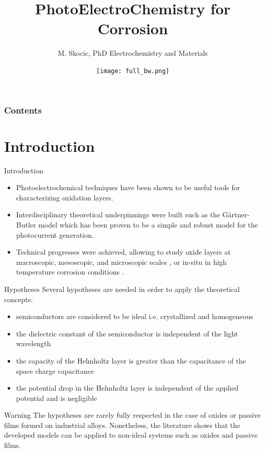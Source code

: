 \documentclass[10pt,compress]{beamer}
\title{PhotoElectroChemistry for Corrosion}
\author{M. Skocic, PhD Electrochemistry and Materials}
\date{\vfill \texttt{[image: full\_bw.png]}}
\begin{document}
    \begin{frame}
        \titlepage
    \end{frame}

    \begin{frame}
        \frametitle{Contents}
        \tableofcontents
    \end{frame}


\section{Introduction}
    \begin{frame}{Introduction}
        \begin{itemize}
            \item Photoelectrochemical techniques have been shown to be useful tools for characterizing oxidation layers. 
            \item Interdisciplinary theoretical underpinnings were built \citep{morrison1980, vijh1969, stimming1986, diquarto1997, wouters2007} 
                  such as the Gärtner-Butler model \citep{gartner1959,butler1977}
                  which has been proven to be a simple and robust model for the photocurrent generation. 
            \item Technical progresses were achieved, allowing to study oxide layers at 
                  macroscopic, mesoscopic, and microscopic scales 
                  \citep{benaboud2007, srisrual2011}, or in-situ in high temperature corrosion 
                  conditions \citep{bojinov2002,skocic2016}.
        \end{itemize}
    \end{frame}

    \begin{frame}{Hypotheses}
        Several hypotheses are needed in order to apply the theoretical concepts:  
        \begin{itemize}
            \item semiconductors are considered to be ideal i.e. crystallized and homogeneous  
            \item the dielectric constant of the semiconductor is independent of the light wavelength  
            \item the capacity of the Helmholtz layer is greater than the capacitance of the space charge capacitance  
            \item the potential drop in the Helmholtz layer is independent of the applied potential and is negligible
        \end{itemize}

        \footnotesize
        \begin{alertblock}{Warning}
            The hypotheses are rarely fully respected in the case of oxides or passive 
            films formed on industrial alloys. Nonetheless, the literature shows that the 
            developed models can be applied to non-ideal systems such as oxides 
            and passive films.
        \end{alertblock}
    \end{frame}
\end{document}
